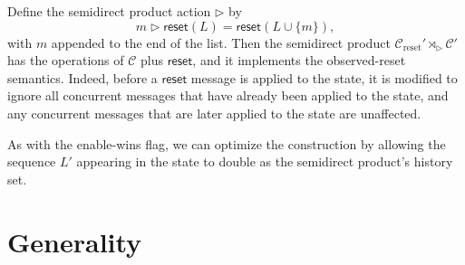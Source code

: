 \documentclass[acmsmall,nonacm]{acmart}
\newcommand{\mc}[1]{\ensuremath{\mathcal{#1}}}
\newcommand{\msf}[1]{\ensuremath{\mathsf{#1}}}
\newcommand{\act}{\triangleright}
\theoremstyle{plain}
\newtheorem{myprop}[mythm]{Proposition}
\theoremstyle{definition}
\begin{document}
Define the semidirect product action $\act$ by
\[
m \act \msf{reset}(L) = \msf{reset}(L \cup \{m\}),
\]
with $m$ appended to the end of the list.  Then the semidirect product $\mc{C}_{\text{reset}}' \rtimes_\act \mc{C}'$ has the operations of $\mc{C}$ plus $\msf{reset}$, and it implements the observed-reset semantics.  Indeed, before a $\msf{reset}$ message is applied to the state, it is modified to ignore all concurrent messages that have already been applied to the state, and any concurrent messages that are later applied to the state are unaffected.

As with the enable-wins flag, we can optimize the construction by allowing the sequence $L'$ appearing in the state to double as the semidirect product's history set.








\section{Generality}
\end{document}
